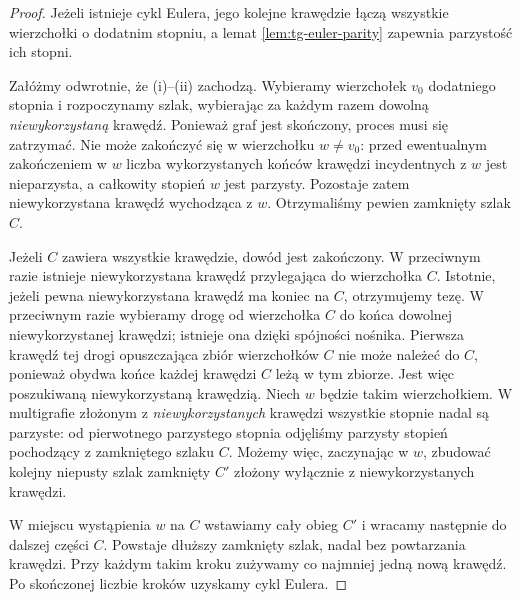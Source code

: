 \begin{proof}
Jeżeli istnieje cykl Eulera, jego kolejne krawędzie łączą
wszystkie wierzchołki o dodatnim stopniu, a lemat
\ref{lem:tg-euler-parity} zapewnia parzystość ich stopni.

Załóżmy odwrotnie, że (i)--(ii) zachodzą. Wybieramy wierzchołek
$v_0$ dodatniego stopnia i rozpoczynamy szlak, wybierając
za każdym razem dowolną \emph{niewykorzystaną} krawędź.
Ponieważ graf jest skończony, proces musi się zatrzymać.
Nie może zakończyć się w wierzchołku $w\ne v_0$:
przed ewentualnym zakończeniem w $w$ liczba wykorzystanych
końców krawędzi incydentnych z $w$ jest nieparzysta,
a całkowity stopień $w$ jest parzysty. Pozostaje zatem
niewykorzystana krawędź wychodząca z $w$.
Otrzymaliśmy pewien zamknięty szlak $C$.

Jeżeli $C$ zawiera wszystkie krawędzie, dowód jest zakończony.
W przeciwnym razie istnieje niewykorzystana krawędź
przylegająca do wierzchołka $C$. Istotnie, jeżeli pewna niewykorzystana krawędź ma koniec
na $C$, otrzymujemy tezę. W przeciwnym razie wybieramy
drogę od wierzchołka $C$ do końca dowolnej niewykorzystanej
krawędzi; istnieje ona dzięki spójności nośnika.
Pierwsza krawędź tej drogi opuszczająca zbiór wierzchołków
$C$ nie może należeć do $C$, ponieważ obydwa końce każdej
krawędzi $C$ leżą w tym zbiorze. Jest więc poszukiwaną
niewykorzystaną krawędzią. Niech $w$ będzie takim wierzchołkiem.
W multigrafie złożonym z \emph{niewykorzystanych} krawędzi
wszystkie stopnie nadal są parzyste: od pierwotnego
parzystego stopnia odjęliśmy parzysty stopień pochodzący
z zamkniętego szlaku $C$. Możemy więc, zaczynając w $w$,
zbudować kolejny niepusty szlak zamknięty $C'$ złożony
wyłącznie z niewykorzystanych krawędzi.

W miejscu wystąpienia $w$ na $C$ wstawiamy cały obieg $C'$
i wracamy następnie do dalszej części $C$. Powstaje dłuższy
zamknięty szlak, nadal bez powtarzania krawędzi.
Przy każdym takim kroku zużywamy co najmniej jedną nową
krawędź. Po skończonej liczbie kroków uzyskamy cykl Eulera.
\end{proof}

